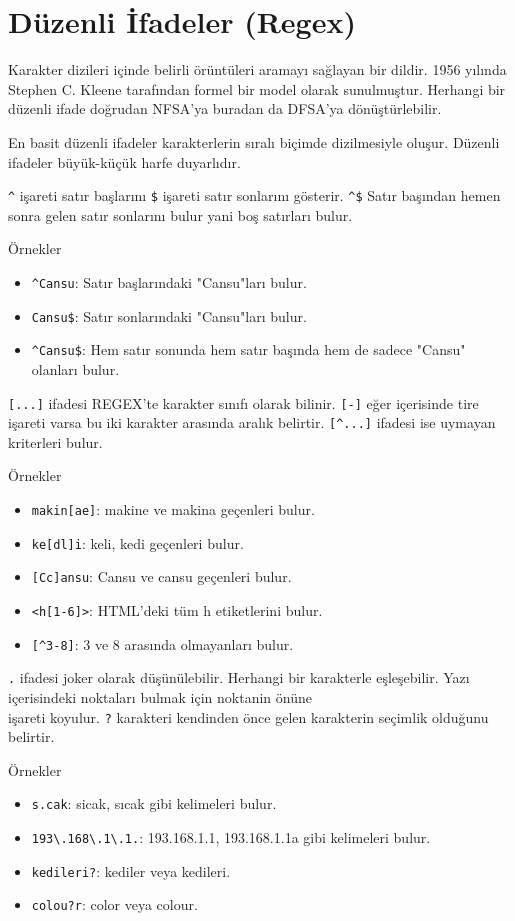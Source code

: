\section{Düzenli İfadeler (Regex)}
Karakter dizileri içinde belirli örüntüleri aramayı sağlayan bir dildir. 1956 yılında Stephen C. Kleene tarafından formel bir model olarak sunulmuştur. Herhangi bir düzenli ifade doğrudan NFSA'ya buradan da DFSA'ya dönüştürlebilir.

En basit düzenli ifadeler karakterlerin sıralı biçimde dizilmesiyle oluşur. Düzenli ifadeler büyük-küçük harfe duyarlıdır.

\verb|^| işareti satır başlarını \verb|$| işareti satır sonlarını gösterir. \verb|^$| Satır başından hemen sonra gelen satır sonlarını bulur yani boş satırları bulur.

Örnekler
\begin{itemize}
    \item \verb|^Cansu|: Satır başlarındaki "Cansu"ları bulur.
    \item \verb|Cansu$|: Satır sonlarındaki "Cansu"ları bulur.
    \item \verb|^Cansu$|: Hem satır sonunda hem satır başında hem de sadece "Cansu" olanları bulur.
\end{itemize}

\verb|[...]| ifadesi REGEX'te karakter sınıfı olarak bilinir. \verb|[-]| eğer içerisinde tire işareti varsa bu iki karakter arasında aralık belirtir. \verb|[^...]| ifadesi ise uymayan kriterleri bulur.

Örnekler
\begin{itemize}
    \item \verb|makin[ae]|: makine ve makina geçenleri bulur.
    \item \verb|ke[dl]i|: keli, kedi geçenleri bulur.
    \item \verb|[Cc]ansu|: Cansu ve cansu geçenleri bulur.
    \item \verb|<h[1-6]>|: HTML'deki tüm h etiketlerini bulur.
    \item \verb|[^3-8]|: 3 ve 8 arasında olmayanları bulur.
\end{itemize}

\verb|.| ifadesi joker olarak düşünülebilir. Herhangi bir karakterle eşleşebilir. Yazı içerisindeki noktaları bulmak için noktanin önüne \\ işareti koyulur. \verb|?| karakteri kendinden önce gelen karakterin seçimlik olduğunu belirtir.

Örnekler
\begin{itemize}
    \item \verb|s.cak|: sicak, sıcak gibi kelimeleri bulur.
    \item \verb|193\.168\.1\.1.|: 193.168.1.1, 193.168.1.1a gibi kelimeleri bulur.
    \item \verb|kedileri?|: kediler veya kedileri.
    \item \verb|colou?r|: color veya colour.
\end{itemize}

